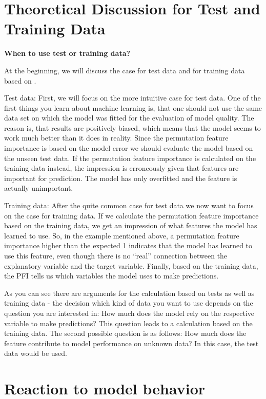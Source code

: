 \documentclass[]{krantz}
\begin{document}
\section{Theoretical Discussion for Test and Training
Data}\label{theoretical-discussion-for-test-and-training-data}

\textbf{When to use test or training data?}

At the beginning, we will discuss the case for test data and for
training data based on \citet{molnar2019}.

Test data: First, we will focus on the more intuitive case for test
data. One of the first things you learn about machine learning is, that
one should not use the same data set on which the model was fitted for
the evaluation of model quality. The reason is, that results are
positively biased, which means that the model seems to work much better
than it does in reality. Since the permutation feature importance is
based on the model error we should evaluate the model based on the
unseen test data. If the permutation feature importance is calculated on
the training data instead, the impression is erroneously given that
features are important for prediction. The model has only overfitted and
the feature is actually unimportant.

Training data: After the quite common case for test data we now want to
focus on the case for training data. If we calculate the permutation
feature importance based on the training data, we get an impression of
what features the model has learned to use. So, in the example mentioned
above, a permutation feature importance higher than the expected 1
indicates that the model has learned to use this feature, even though
there is no ``real'' connection between the explanatory variable and the
target variable. Finally, based on the training data, the PFI tells us
which variables the model uses to make predictions.

As you can see there are arguments for the calculation based on tests as
well as training data - the decision which kind of data you want to use
depends on the question you are interested in: How much does the model
rely on the respective variable to make predictions? This question leads
to a calculation based on the training data. The second possible
question is as follows: How much does the feature contribute to model
performance on unknown data? In this case, the test data would be used.

\section{Reaction to model behavior}\label{reaction-to-model-behavior}
\end{document}
